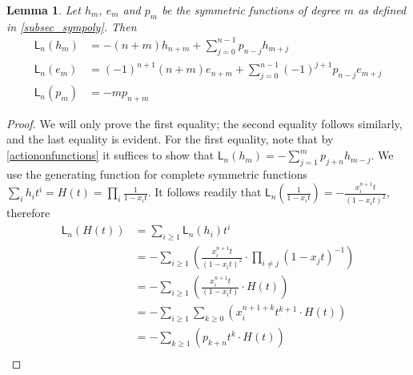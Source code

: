 \documentclass{amsart}
\numberwithin{equation}{section}
\newtheorem{lemma}[thm]{Lemma}
\theoremstyle{definition}
\newcommand{\LLn}[1][n]{{\mathsf{L}_{#1}}}
\begin{document}
\begin{lemma}\label{actiononfunctions}
    Let $h_m$, $e_m$ and $p_m$ be the symmetric functions of degree $m$ as defined in \ref{subsec_sympoly}. Then \begin{align*}
        \LLn[n](h_m) &=  -(n+m)h_{n+m} +\sum_{j = 0}^{n-1} p_{n - j} h_{m+j} \\
        \LLn[n](e_m) &=  (-1)^{n+1} (n+m)e_{n+m} + \sum_{j = 0}^{n-1} (-1)^{j+1} p_{n - j} e_{m+j}\\
        \LLn[n](p_m) &= - m p_{n + m}  
    \end{align*}
\end{lemma}
\begin{proof}
    We will only prove the first equality; the second equality follows similarly, and the last equality is evident.
    For the first equality, note that by \eqref{actiononfunctions} it suffices to show that $\LLn(h_m) = - \sum_{j = 1}^m p_{j+n} h_{m-j}$. We use the  generating function for complete symmetric functions $\sum_i h_i t^i = H(t) = \prod_{i} \frac{1}{1-x_i t}$. It follows readily that $\LLn[n]( \frac{1}{1-x_i t}) = - \frac{x_i^{n+1}t}{(1 - x_i t)^2}$, therefore
    \begin{align*}
        \LLn[n](H(t)) &= \sum_{i \geq 1} \LLn[n](h_i)t^i \\
        &= -\sum_{i \geq 1}\left(\frac{x_i^{n+1}t}{(1 - x_i t)^2} \cdot \prod_{i \neq j} (1 - x_jt)^{-1} \right) \\
        &= -\sum_{i \geq 1} \left(\frac{x_i^{n+1}t}{(1 - x_i t)} \cdot H(t) \right) \\
        &= -\sum_{i \geq 1} \sum_{k \geq 0} \left(x_i^{n+1+k}t^{k+1} \cdot H(t) \right) \\
        &= - \sum_{k \geq 1} \left(p_{k+n}t^{k} \cdot H(t) \right) \\
    \end{align*}

\end{proof}
\end{document}
